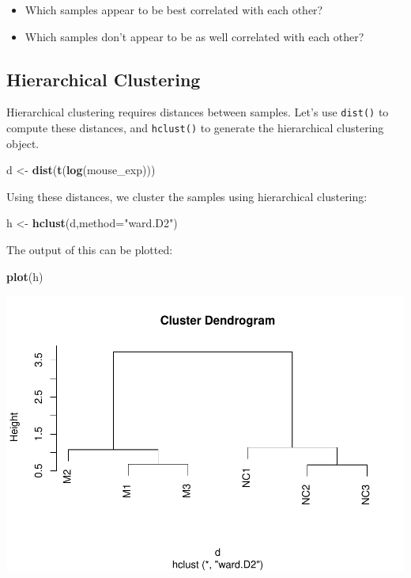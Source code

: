 \documentclass[
]{book}
\newenvironment{Shaded}{\begin{snugshade}}{\end{snugshade}}
\newcommand{\AttributeTok}[1]{\textcolor[rgb]{0.13,0.29,0.53}{#1}}
\newcommand{\FunctionTok}[1]{\textcolor[rgb]{0.13,0.29,0.53}{\textbf{#1}}}
\newcommand{\NormalTok}[1]{#1}
\newcommand{\OtherTok}[1]{\textcolor[rgb]{0.56,0.35,0.01}{#1}}
\newcommand{\StringTok}[1]{\textcolor[rgb]{0.31,0.60,0.02}{#1}}
\providecommand{\tightlist}{%
  \setlength{\itemsep}{0pt}\setlength{\parskip}{0pt}}
\begin{document}
\begin{itemize}
\tightlist
\item
  Which samples appear to be best correlated with each other?
\item
  Which samples don't appear to be as well correlated with each other?
\end{itemize}

\subsection{Hierarchical Clustering}\label{hierarchical-clustering}

Hierarchical clustering requires distances between samples. Let's use \texttt{dist()} to compute these distances, and \texttt{hclust()} to generate the hierarchical clustering object.

\begin{Shaded}
\begin{Highlighting}[]
\NormalTok{d }\OtherTok{\textless{}{-}} \FunctionTok{dist}\NormalTok{(}\FunctionTok{t}\NormalTok{(}\FunctionTok{log}\NormalTok{(mouse\_exp)))}
\end{Highlighting}
\end{Shaded}

Using these distances, we cluster the samples using hierarchical clustering:

\begin{Shaded}
\begin{Highlighting}[]
\NormalTok{h }\OtherTok{\textless{}{-}} \FunctionTok{hclust}\NormalTok{(d,}\AttributeTok{method=}\StringTok{"ward.D2"}\NormalTok{)}
\end{Highlighting}
\end{Shaded}

The output of this can be plotted:

\begin{Shaded}
\begin{Highlighting}[]
\FunctionTok{plot}\NormalTok{(h)}
\end{Highlighting}
\end{Shaded}

\includegraphics{_main_files/figure-latex/unnamed-chunk-12-1.pdf}
\end{document}
